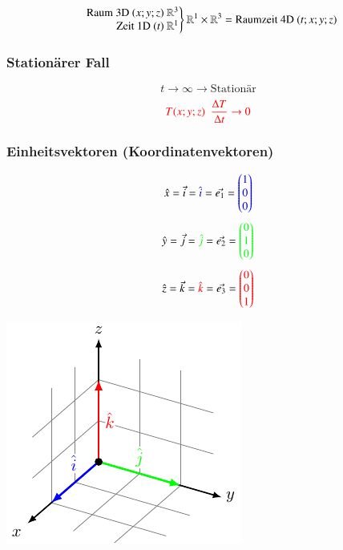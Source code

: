 $$\left.\begin{array}{r@{}}
    \text{Raum 3D ${(x;y;z)}$ }\rreal^3\\
    \text{Zeit 1D ${(t)}$ }\rreal^1
\end{array}\right\rbrace \rreal^{1}\times \rreal^3 = \text{Raumzeit 4D} \text{ } (t;x;y;z)$$

\subsubsection{Stationärer Fall}
$${t \rightarrow \infty \rightarrow \text{Stationär}}$$
$${{\color{red}T(x;y;z) \enspace\frac{\Delta{T}}{\Delta{t}} \rightarrow 0 }}$$


\subsubsection{Einheitsvektoren (Koordinatenvektoren)}

\begin{minipage}[c]{0.48\columnwidth}
    $$\hat{x}=\vec{i}={\color{blue}\hat{i}}=\vec{{e}_1}=
{\color{blue}\begin{pmatrix}
    1 \\
    0 \\
    0
\end{pmatrix}}$$
$$\hat{y}=\vec{j}={\color{green}\hat{j}}=\vec{{e}_2}=
{\color{green}\begin{pmatrix}
    0 \\
    1 \\
    0
\end{pmatrix}}$$
$$\hat{z}=\vec{k}={\color{red}\hat{k}}=\vec{{e}_3}=
{\color{red}\begin{pmatrix}
    0 \\
    0 \\
    1
\end{pmatrix}}$$
\end{minipage}
\hfill
\begin{minipage}[c]{0.48\columnwidth}
    \includegraphics[width=\columnwidth]{images/einheitsvektoren.pdf}
\end{minipage}

